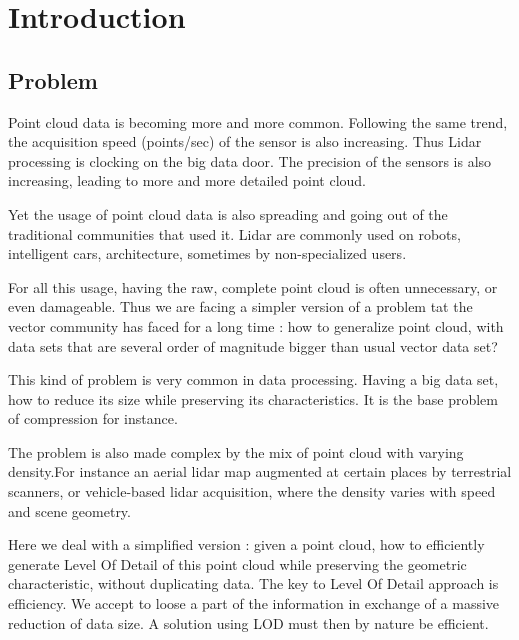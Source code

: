 

\section{Introduction}
	\subsection{Problem} 
	 
		Point cloud data is becoming more and more common. Following the same trend, the acquisition speed (points/sec) of the sensor is also increasing.
		Thus Lidar processing is clocking on the big data door.
		The precision of the sensors is also increasing, leading to more and more detailed point cloud.
		
		Yet the usage of point cloud data is also spreading and going out of the traditional communities that used it. 
		Lidar are commonly used on robots, intelligent cars, architecture, sometimes by non-specialized users. 
		
		
		For all this usage, having the raw, complete point cloud is often unnecessary, or even damageable.
		Thus we are facing a simpler version of a problem tat the vector community has faced for a long time : how to generalize point cloud, with data sets that are several order of magnitude bigger than usual vector data set?
		
		This kind of problem is very common in data processing. Having a big data set, how to reduce its size while preserving its characteristics.
		It is the base problem of compression for instance.
		
		The problem is also made complex by the mix of point cloud with varying density.For instance an aerial lidar map augmented at certain places by terrestrial scanners, or vehicle-based lidar acquisition, where the density varies with speed and scene geometry.
		
		Here we deal with a simplified version : given a point cloud, how to efficiently generate Level Of Detail of this point cloud while preserving the geometric characteristic, without duplicating data.
		The key to Level Of Detail approach is efficiency. We accept to loose a part of the information in exchange of a massive reduction of data size. A solution using LOD must then by nature be efficient.
		
